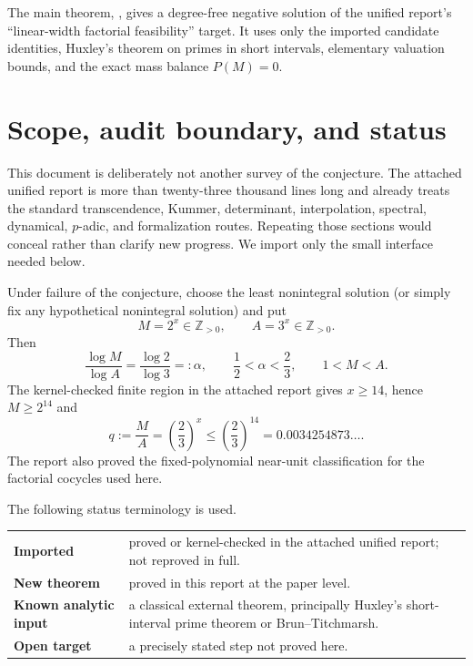 \documentclass[11pt,oneside]{article}
\theoremstyle{definition}
\theoremstyle{remark}
\newcommand{\Z}{\mathbb Z}
\begin{document}
\begin{newresult}[ --- headline]
The main theorem, , gives a degree-free negative solution of the
unified report's ``linear-width factorial feasibility'' target.  It uses only the imported
candidate identities, Huxley's theorem on primes in short intervals, elementary valuation
bounds, and the exact mass balance $P(M)=0$.
\end{newresult}

\tableofcontents
\newpage

\section{Scope, audit boundary, and status}
\label{sec:scope}

This document is deliberately not another survey of the conjecture.  The attached unified
report is more than twenty-three thousand lines long and already treats the standard
transcendence, Kummer, determinant, interpolation, spectral, dynamical, $p$-adic, and
formalization routes.  Repeating those sections would conceal rather than clarify new
progress.  We import only the small interface needed below.

\begin{imported}
Under failure of the conjecture, choose the least nonintegral solution (or simply fix any
hypothetical nonintegral solution) and put
\[
 M=2^x\in\Z_{>0},\qquad A=3^x\in\Z_{>0}.
\]
Then
\[
 \frac{\log M}{\log A}=\frac{\log2}{\log3}=:\alpha,
 \qquad \frac12<\alpha<\frac23,
 \qquad 1<M<A.
\]
The kernel-checked finite region in the attached report gives $x\ge14$, hence
$M\ge2^{14}$ and
\[
 q:=\frac MA=\left(\frac23\right)^x
 \le\left(\frac23\right)^{14}=0.0034254873\ldots.
\]
The report also proved the fixed-polynomial near-unit classification for the factorial
cocycles used here.
\end{imported}

The following status terminology is used.

\begin{center}
\begin{tabularx}{0.94\textwidth}{>{\bfseries}lX}
\toprule
Imported & proved or kernel-checked in the attached unified report; not reproved in full.\\
New theorem & proved in this report at the paper level.\\
Known analytic input & a classical external theorem, principally Huxley's short-interval
prime theorem or Brun--Titchmarsh.\\
Open target & a precisely stated step not proved here.\\
\bottomrule
\end{tabularx}
\end{center}
\end{document}
